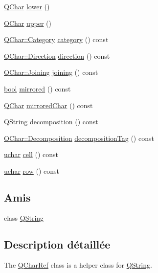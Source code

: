 \begin{DoxyCompactItemize}
\hyperlink{class_q_char}{Q\+Char} \hyperlink{class_q_char_ref_af9ac15bb537cae169176a52fc1572077}{lower} ()
\item 
\hyperlink{class_q_char}{Q\+Char} \hyperlink{class_q_char_ref_adf1b7021f0ef1f5bf81028071ec19b6a}{upper} ()
\item 
\hyperlink{class_q_char_a62908095db0c54f35ff2ae928c621a97}{Q\+Char\+::\+Category} \hyperlink{class_q_char_ref_a014a0326d2c60422744573c5e0fbf5d4}{category} () const 
\item 
\hyperlink{class_q_char_a54978126be7630b3e85394325a822302}{Q\+Char\+::\+Direction} \hyperlink{class_q_char_ref_afee2920cb0965c1d199519ef662bd28a}{direction} () const 
\item 
\hyperlink{class_q_char_a086edd55a90ad2cf910ca3ab5fbe7bde}{Q\+Char\+::\+Joining} \hyperlink{class_q_char_ref_a3d771af875bc56befe981c5c3a1ea145}{joining} () const 
\item 
\hyperlink{qglobal_8h_a1062901a7428fdd9c7f180f5e01ea056}{bool} \hyperlink{class_q_char_ref_a0d7ed55c1aeea9ccc8493654468bbc34}{mirrored} () const 
\item 
\hyperlink{class_q_char}{Q\+Char} \hyperlink{class_q_char_ref_ae8a0d0d4c4edf1251cf3a8cc69595f39}{mirrored\+Char} () const 
\item 
\hyperlink{class_q_string}{Q\+String} \hyperlink{class_q_char_ref_ae7152e34b4796e1e6561cc6fa88dc753}{decomposition} () const 
\item 
\hyperlink{class_q_char_a13be45046e82a6d2991cef0b7c18d522}{Q\+Char\+::\+Decomposition} \hyperlink{class_q_char_ref_a81d23ba1e3de020465e7d27f93b41408}{decomposition\+Tag} () const 
\item 
\hyperlink{qglobal_8h_a65f85814a8290f9797005d3b28e7e5fc}{uchar} \hyperlink{class_q_char_ref_ae2e56b51f9ecd8a987c8236c55470245}{cell} () const 
\item 
\hyperlink{qglobal_8h_a65f85814a8290f9797005d3b28e7e5fc}{uchar} \hyperlink{class_q_char_ref_ade33a738e60502a836922e3586969ed8}{row} () const 
\end{DoxyCompactItemize}
\subsection*{Amis}
\begin{DoxyCompactItemize}
\item 
class \hyperlink{class_q_char_ref_a9e1fc451dd8095b29e730972a34bad70}{Q\+String}
\end{DoxyCompactItemize}


\subsection{Description détaillée}
The \hyperlink{class_q_char_ref}{Q\+Char\+Ref} class is a helper class for \hyperlink{class_q_string}{Q\+String}. 

